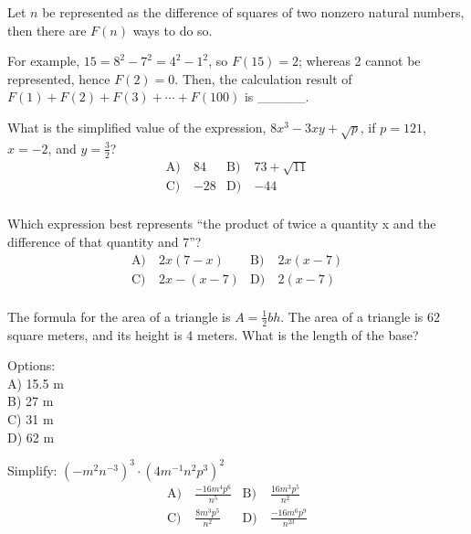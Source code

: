 \begin{problem}\label{Combinary-39}
 Let $n$ be represented as the difference of squares of two nonzero natural numbers, then there are $F(n)$ ways to do so.

For example, $15=8^{2}-7^{2}=4^{2}-1^{2}$, so $F(15)=2$; whereas 2 cannot be represented, hence $F(2)=0$. Then, the calculation result of $F(1)+F(2)+F(3)+\cdots+F(100)$ is \_\_\_\_\_.
\end{problem}


\begin{problem}\label{Alg1}
 What is the simplified value of the expression, $8x^3-3xy+\sqrt{p}$, if $p=121$, $x=-2$, and $y=\frac{3}{2}$?
\begin{align*}
\text{A)}\ & 84 &
\text{B)}\ & 73+\sqrt{11}\\
\text{C)}\ & -28  &
\text{D)}\ & -44\\
\end{align*} 
\end{problem}

\begin{problem}\label{Alg2}
Which expression best represents “the product of twice a quantity x and the difference of that quantity and 7”? 
\begin{align*}
\text{A)}\ & 2x(7-x) & 
\text{B)}\ & 2x(x-7) \\
\text{C)}\ & 2x-(x-7) & 
\text{D)}\ & 2(x-7)\\
\end{align*}
	
\end{problem}	


\begin{problem}\label{AI-Geometry1}
The formula for the area of a triangle is $A = \frac{1}{2}bh$. The area of a triangle is 62 square meters, and its height is 4 meters. What is the length of the base?

\noindent Options:\\
A) 15.5 m\\
B) 27 m\\
C) 31 m\\
D) 62 m
\end{problem}

\begin{problem}\label{Alg4}
Simplify: $(-m^2n^{-3})^3 \cdot (4m^{-1}n^2p^3)^2$
\begin{align*}
\text{A)}\ & \frac{-16m^4p^6}{n^5} &
\text{B)}\ & \frac{16m^3p^5}{n^2} \\
\text{C)}\ & \frac{8m^3p^5}{n^2}  &
\text{D)}\ & \frac{-16m^6p^9}{n^{23}}\\
\end{align*}    
\end{problem}


